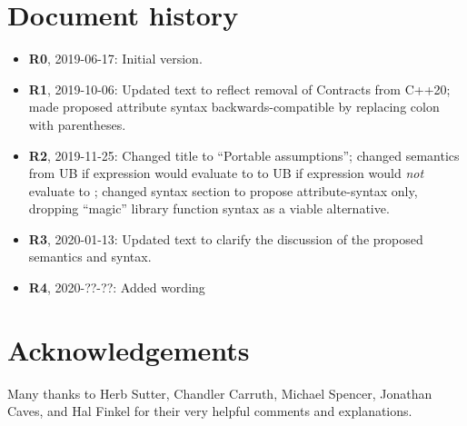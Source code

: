 \section*{Document history}

\begin{itemize}
\item \textbf{R0}, 2019-06-17: Initial version.
\item \textbf{R1}, 2019-10-06: Updated text to reflect removal of Contracts from C++20; made proposed attribute syntax backwards-compatible by replacing colon with parentheses.
\item \textbf{R2}, 2019-11-25: Changed title to ``Portable assumptions''; changed semantics from UB if expression would evaluate to  to UB if expression would \emph{not} evaluate to ; changed syntax section to propose attribute-syntax only, dropping ``magic'' library function syntax as a viable alternative.
\item \textbf {R3}, 2020-01-13: Updated text to clarify the discussion of the proposed semantics and syntax.
\item \textbf{R4}, 2020-??-??:  Added wording
\end{itemize}

\section*{Acknowledgements}

Many thanks to Herb Sutter, Chandler Carruth, Michael Spencer, Jonathan Caves, and Hal Finkel for their very helpful comments and explanations.

\renewcommand{\bibname}{References}



